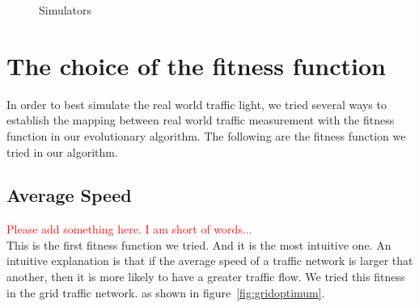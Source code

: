 \documentclass{article} %
\begin{document}
\begin{figure}[h]
 \centering
  \caption{Simulators}
   \label{fig:simulator} %
\end{figure}


\section{The choice of the fitness function}
In order to best simulate the real world traffic light, we tried several ways to establish the mapping between real world traffic measurement with the fitness function in our evolutionary algorithm. The following are the fitness function we tried in our algorithm.
\subsection{Average Speed}
\textcolor{red}{Please add something here. I am short of words...}\\
This is the first fitness function we tried. And it is the most intuitive one. An intuitive explanation is that if the average speed of a traffic network is larger that another, then it is more likely to have a greater traffic flow. We tried this fitness in the grid traffic network. as shown in figure~\ref{fig:gridoptimum}.
\end{document}
